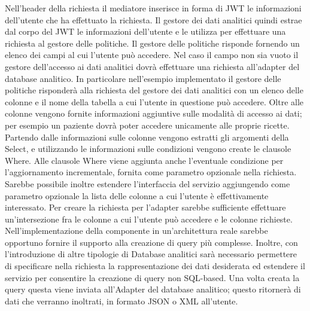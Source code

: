 \documentclass[12pt]{report}
\begin{document}
Nell'header della richiesta il mediatore inserisce in forma di JWT le informazioni dell'utente che ha effettuato la richiesta.
Il gestore dei dati analitici quindi estrae dal corpo del JWT le informazioni dell'utente e le utilizza per effettuare una richiesta al gestore delle politiche.
Il gestore delle politiche risponde fornendo un elenco dei campi al cui l'utente può accedere.
Nel caso il campo non sia vuoto il gestore dell'accesso ai dati analitici dovrà effettuare una richiesta all'adapter del database analitico.
In particolare nell'esempio implementato il gestore delle politiche risponderà alla richiesta del gestore dei dati analitici con un elenco delle colonne e il nome della tabella a cui l'utente in questione può accedere.
Oltre alle colonne vengono fornite informazioni aggiuntive sulle modalità di accesso ai dati; per esempio un paziente dovrà poter accedere unicamente alle proprie ricette.
Partendo dalle informazioni sulle colonne vengono estratti gli argomenti della Select, e utilizzando le informazioni sulle condizioni vengono create le clausole Where.
Alle clausole Where viene aggiunta anche l'eventuale condizione per l'aggiornamento incrementale, fornita come parametro opzionale nella richiesta.
Sarebbe possibile inoltre estendere l'interfaccia del servizio aggiungendo come parametro opzionale la lista delle colonne a cui l'utente è effettivamente interessato.
Per creare la richiesta per l'adapter sarebbe sufficiente effettuare un'intersezione fra le colonne a cui l'utente può accedere e le colonne richieste.
Nell'implementazione della componente in un'architettura reale sarebbe opportuno fornire il supporto alla creazione di query più complesse.
Inoltre, con l'introduzione di altre tipologie di Database analitici sarà necessario permettere di specificare nella richiesta la rappresentazione dei dati desiderata ed estendere il servizio per consentire la creazione di query non SQL-based. 
Una volta creata la query questa viene inviata all'Adapter del database analitico; questo ritornerà di dati che verranno inoltrati, in formato JSON o XML all'utente.
\end{document}
